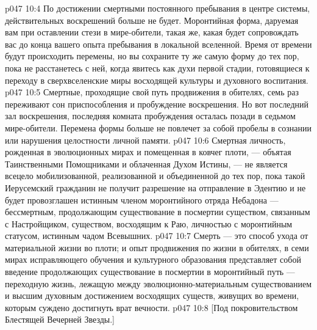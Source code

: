 \vs p047 10:4 \pc По достижении смертными постоянного пребывания в центре системы, действительных воскрешений больше не будет. Моронтийная форма, даруемая вам при оставлении стези в мире\hyp{}обители, такая же, какая будет сопровождать вас до конца вашего опыта пребывания в локальной вселенной. Время от времени будут происходить перемены, но вы сохраните ту же самую форму до тех пор, пока не расстанетесь с ней, когда явитесь как духи первой стадии, готовящиеся к переходу в сверхвселенские миры восходящей культуры и духовного воспитания.
\vs p047 10:5 Смертные, проходящие свой путь продвижения в обителях, семь раз переживают сон приспособления и пробуждение воскрешения. Но вот последний зал воскрешения, последняя комната пробуждения осталась позади в седьмом мире\hyp{}обители. Перемена формы больше не повлечет за собой пробелы в сознании или нарушения целостности личной памяти.
\vs p047 10:6 \pc Смертная личность, рожденная в эволюционных мирах и помещенная в ковчег плоти, --- объятая Таинственными Помощниками и облаченная Духом Истины, --- не является всецело мобилизованной, реализованной и объединенной до тех пор, пока такой Иерусемский гражданин не получит разрешение на отправление в Эдентию и не будет провозглашен истинным членом моронтийного отряда Небадона --- бессмертным, продолжающим существование в посмертии существом, связанным с Настройщиком, существом, восходящим к Раю, личностью с моронтийным статусом, истинным чадом Всевышних.
\vs p047 10:7 \pc Смерть --- это способ ухода от материальной жизни во плоти; и опыт продвижения по жизни в обителях, в семи мирах исправляющего обучения и культурного образования представляет собой введение продолжающих существование в посмертии в моронтийный путь --- переходную жизнь, лежащую между эволюционно\hyp{}материальным существованием и высшим духовным достижением восходящих существ, живущих во времени, которым суждено достигнуть врат вечности.
\vsetoff
\vs p047 10:8 [Под покровительством Блестящей Вечерней Звезды.]
